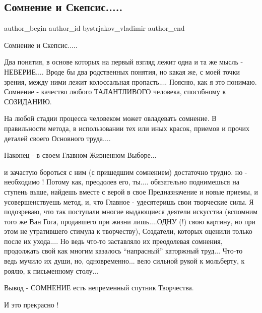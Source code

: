  
 
 
 
 
\subsection{Сомнение и Скепсис.....}
\label{sec:20_12_2021.tg.bystrjakov_vladimir.1.somnenie_i_skepsis}

\ifcmt
 author_begin
   author_id bystrjakov_vladimir
 author_end
\fi

Сомнение и Скепсис..... 

Два понятия, в основе которых на первый взгляд лежит одна и та же мысль -
НЕВЕРИЕ.... Вроде бы два родственных понятия, но какая же, с моей точки зрения,
между ними  лежит колоссальная пропасть.... Поясню, как я это понимаю. Сомнение
- качество любого ТАЛАНТЛИВОГО человека, способному к СОЗИДАНИЮ. 

На любой стадии процесса человеком может овладевать сомнение. В правильности
метода, в использовании тех или иных красок, приемов и прочих деталей своего
Основного труда.... 

Наконец - в своем Главном Жизненном Выборе... 

и зачастую бороться с ним (с пришедшим сомнением) достаточно трудно. но -
необходимо ! Потому как, преодолев его, ты.... обязательно поднимешься на
ступень выше, найдешь вместе с верой в свое Предназначение и новые приемы, и
усовершенствуешь метод, и, что Главное - удесятеришь свои творческие силы. Я
подозреваю, что так поступали многие выдающиеся деятели  искусства (вспомним
того же Ван Гога, продавшего при жизни лишь....ОДНУ (!) свою картину, но при
этом не утратившего стимула к творчеству), Создатели, которых оценили только
после их ухода.... Но ведь что-то заставляло их преодолевая сомнения,
продолжать свой как многим казалось \enquote{напрасный} каторжный труд... Что-то ведь
мучило их души, но, одновременно... вело сильной рукой к мольберту, к роялю, к
письменному столу...

Вывод - СОМНЕНИЕ есть непременный спутник Творчества. 

И это прекрасно !

